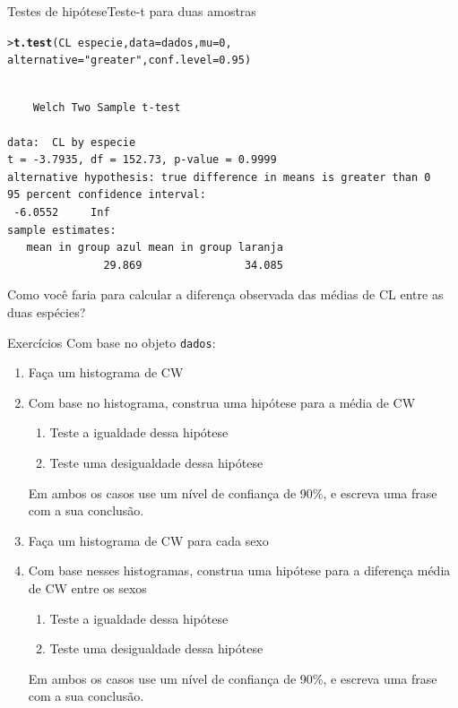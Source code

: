 \documentclass[10pt]{beamer}\usepackage[]{graphicx}\usepackage[]{color}
\makeatletter
\newcommand{\hlnum}[1]{\textcolor[rgb]{0.686,0.059,0.569}{#1}}%
\newcommand{\hlstr}[1]{\textcolor[rgb]{0.282,0.239,0.545}{#1}}%
\newcommand{\hlopt}[1]{\textcolor[rgb]{0,0,0}{#1}}%
\newcommand{\hlstd}[1]{\textcolor[rgb]{0.345,0.345,0.345}{#1}}%
\newcommand{\hlkwc}[1]{\textcolor[rgb]{0.333,0.667,0.333}{#1}}%
\newcommand{\hlkwd}[1]{\textcolor[rgb]{0.282,0.239,0.545}{\textbf{#1}}}%
\newenvironment{kframe}{%
 \def\at@end@of@kframe{}%
 \ifinner\ifhmode%
  \def\at@end@of@kframe{\end{minipage}}%
  \begin{minipage}{\columnwidth}%
 \fi\fi%
 \def\FrameCommand##1{\hskip\@totalleftmargin \hskip-\fboxsep
 \colorbox{shadecolor}{##1}\hskip-\fboxsep
     \hskip-\linewidth \hskip-\@totalleftmargin \hskip\columnwidth}%
 \MakeFramed {\advance\hsize-\width
   \@totalleftmargin\z@ \linewidth\hsize
   \@setminipage}}%
 {\par\unskip\endMakeFramed%
 \at@end@of@kframe}
\newenvironment{knitrout}{}{} %
\makeatother
\begin{document}
\begin{frame}[fragile=singleslide]{Testes de hipótese}{Teste-t para duas amostras}
\begin{knitrout}\small
{}\color{fgcolor}\begin{kframe}
\begin{alltt}
\hlstd{> }\hlkwd{t.test}\hlstd{(CL} \hlopt{~} \hlstd{especie,} \hlkwc{data} \hlstd{= dados,} \hlkwc{mu} \hlstd{=} \hlnum{0}\hlstd{,}
\hlstd{  }       \hlkwc{alternative} \hlstd{=} \hlstr{"greater"}\hlstd{,} \hlkwc{conf.level} \hlstd{=} \hlnum{0.95}\hlstd{)}
\end{alltt}
\begin{verbatim}

	Welch Two Sample t-test

data:  CL by especie
t = -3.7935, df = 152.73, p-value = 0.9999
alternative hypothesis: true difference in means is greater than 0
95 percent confidence interval:
 -6.0552     Inf
sample estimates:
   mean in group azul mean in group laranja 
               29.869                34.085 
\end{verbatim}
\end{kframe}
\end{knitrout}

Como você faria para calcular a diferença observada das médias de CL
entre as duas espécies?
\end{frame}

\begin{frame}[fragile=singleslide]{Exercícios}
Com base no objeto \texttt{dados}:
  \begin{enumerate}
  \item Faça um histograma de CW
  \item Com base no histograma, construa uma hipótese para a média de CW
    \begin{enumerate}
    \item Teste a igualdade dessa hipótese
    \item Teste uma desigualdade dessa hipótese
    \end{enumerate}
    Em ambos os casos use um nível de confiança de 90\%, e escreva uma
    frase com a sua conclusão.
  \item Faça um histograma de CW para cada sexo
  \item Com base nesses histogramas, construa uma hipótese para a
    diferença média de CW entre os sexos
    \begin{enumerate}
    \item Teste a igualdade dessa hipótese
    \item Teste uma desigualdade dessa hipótese
    \end{enumerate}
    Em ambos os casos use um nível de confiança de 90\%, e escreva uma
    frase com a sua conclusão.
  \end{enumerate}
\end{frame}
\end{document}
